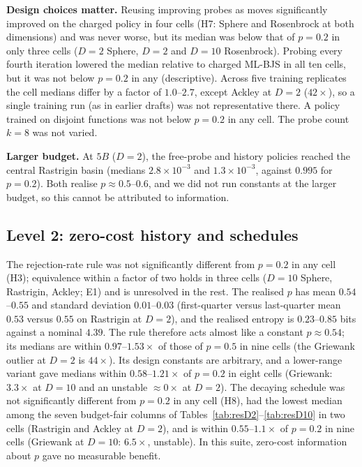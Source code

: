 \documentclass[conference]{IEEEtran}
\begin{document}
\textbf{Design choices matter.} Reusing improving probes as moves significantly improved on the charged policy in four cells (H7: Sphere and Rosenbrock at both dimensions) and was never worse, but its median was below that of $p=0.2$ in only three cells ($D=2$ Sphere, $D=2$ and $D=10$ Rosenbrock). Probing every fourth iteration lowered the median relative to charged ML-BJS in all ten cells, but it was not below $p=0.2$ in any (descriptive). Across five training replicates the cell medians differ by a factor of $1.0$--$2.7$, except Ackley at $D=2$ ($42\times$), so a single training run (as in earlier drafts) was not representative there. A policy trained on disjoint functions was not below $p=0.2$ in any cell. The probe count $k=8$ was not varied.

\textbf{Larger budget.} At $5B$ ($D=2$), the free-probe and history policies reached the central Rastrigin basin (medians $2.8\times10^{-3}$ and $1.3\times10^{-3}$, against $0.995$ for $p=0.2$). Both realise $p\approx0.5$--$0.6$, and we did not run constants at the larger budget, so this cannot be attributed to information.

\subsection{Level 2: zero-cost history and schedules}
The rejection-rate rule was not significantly different from $p=0.2$ in any cell (H3); equivalence within a factor of two holds in three cells ($D=10$ Sphere, Rastrigin, Ackley; E1) and is unresolved in the rest. The realised $p$ has mean $0.54$--$0.55$ and standard deviation $0.01$--$0.03$ (first-quarter versus last-quarter mean $0.53$ versus $0.55$ on Rastrigin at $D=2$), and the realised entropy is $0.23$--$0.85$ bits against a nominal $4.39$. The rule therefore acts almost like a constant $p\approx0.54$; its medians are within $0.97$--$1.53\times$ of those of $p=0.5$ in nine cells (the Griewank outlier at $D=2$ is $44\times$). Its design constants are arbitrary, and a lower-range variant gave medians within $0.58$--$1.21\times$ of $p=0.2$ in eight cells (Griewank: $3.3\times$ at $D=10$ and an unstable $\approx0\times$ at $D=2$). The decaying schedule was not significantly different from $p=0.2$ in any cell (H8), had the lowest median among the seven budget-fair columns of Tables~\ref{tab:resD2}--\ref{tab:resD10} in two cells (Rastrigin and Ackley at $D=2$), and is within $0.55$--$1.1\times$ of $p=0.2$ in nine cells (Griewank at $D=10$: $6.5\times$, unstable). In this suite, zero-cost information about $p$ gave no measurable benefit.
\end{document}
